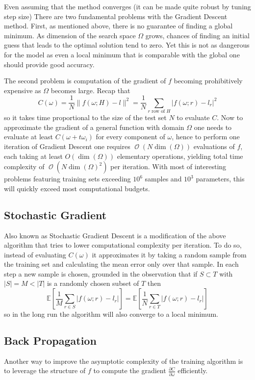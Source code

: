 \documentclass[a4paper]{article}
\theoremstyle{break}
\newcommand{\Exp}{\mathbb{E}}
\DeclareMathOperator{\bO}{\mathcal{O}}
\begin{document}
Even assuming that the method converges (it can be made quite robust by tuning step size) There are two fundamental problems with the Gradient Descent method. First, as mentioned above, there is no guarantee of finding a global minimum. As dimension of the search space $ \Omega $ grows, chances of finding an initial guess that leads to the optimal solution tend to zero. Yet this is not as dangerous for the model as even a local minimum that is comparable with the global one should provide good accuracy.

The second problem is computation of the gradient of $f$ becoming prohibitively expensive as $ \Omega $ becomes large. Recap that
    $$ C(\omega) =  \frac{1}{N} \| f(\omega; H) - l \|^2 =
       \frac{1}{N} \sum_{r \text{ row of } H} | f(\omega; r) - l_r |^2 $$
so it takes time proportional to the size of the test set $N$ to evaluate $C$.
Now to approximate the gradient of a general function with domain $ \Omega $ one needs to evaluate at least $C(\omega + t \omega_i)$ for every component of $ \omega $, hence to perform one iteration of Gradient Descent one requires $ \bO( N  \dim(\Omega) ) $ evaluations of $f$,
each taking at least $ O( \dim(\Omega))$ elementary operations, yielding total time complexity of $ \bO( N \dim(\Omega)^2)$ per iteration. With most of interesting problems featuring training sets exceeding $ 10^6 $ samples and $ 10^3 $ parameters, this will quickly exceed most computational budgets.

\subsection{Stochastic Gradient}
Also known as Stochastic Gradient Descent is a modification of the above algorithm that tries to lower computational complexity per iteration. To do so, instead of evaluating $C(\omega)$ it approximates it by taking a random sample from the training set and calculating the mean error only over that sample. In each step a new sample is chosen, grounded in the observation that if $ S \subset T $ with $ | S | = M < |T| $ is a randomly chosen subset of $T$ then
    $$ \Exp \left[ \frac{1}{M} \sum_{r \in S} | f(\omega; r) - l_r | \right] =
       \Exp \left[ \frac{1}{N} \sum_{r \in T} | f(\omega; r) - l_r | \right] $$
so in the long run the algorithm will also converge to a local minimum.


\subsection{Back Propagation}
Another way to improve the asymptotic complexity of the training algorithm is to leverage the structure of $f$ to compute the gradient $ \frac{\partial C}{\partial \omega} $ efficiently.
\end{document}
